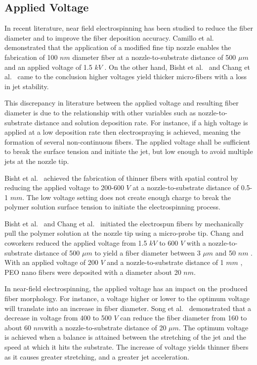 \documentclass[5p,,preprint,12pt,twocolumn]{elsarticle}
\begin{document}
\subsection{Applied Voltage}In recent literature, near field electrospinning has been studied to reduce the fiber diameter and to improve the fiber deposition accuracy. Camillo et al.\unskip~\cite{527120:12322072} demonstrated that the application of a modified fine tip nozzle enables the fabrication of 100 $nm $ diameter fiber at a nozzle-to-substrate distance of 500 $\mu m $ and an applied voltage of 1.5 $kV $ . On the other hand, Bisht et al.\unskip~\cite{527120:11973130} and Chang et al.\unskip~\cite{527120:11974306} came to the conclusion higher voltages yield thicker micro-fibers with a loss in jet stability.

This discrepancy in literature between the applied voltage and resulting fiber diameter is due to the relationship with other variables such as nozzle-to-substrate distance and solution deposition rate. For instance, if a high voltage is applied at a low deposition rate then electrospraying is achieved, meaning the formation of several non-continuous fibers. The applied voltage shall be sufficient to break the surface tension and initiate the jet, but low enough to avoid multiple jets at the nozzle tip.

Bisht et al.\unskip~\cite{527120:11973130} achieved the fabrication of thinner fibers with spatial control by reducing the applied voltage to 200-600 $V $  at a nozzle-to-substrate distance of 0.5-1 $mm $. The low voltage setting does not create enough charge to break the polymer solution surface tension to initiate the electrospinning process.

Bisht et al.\unskip~\cite{527120:11973130} and Chang et al.\unskip~\cite{527120:11974306} initiated the electrospun fibers by mechanically pull the polymer solution at the nozzle tip using a micro-probe tip. Chang and coworkers reduced the applied voltage from 1.5 $kV $ to 600 $V $ with a nozzle-to-substrate distance of 500 $\mu m $ to yield a fiber diameter between 3 $\mu m $  and 50 $nm $ . With an applied voltage of 200 $V $ and a nozzle-to-substrate distance of 1 $mm $ , PEO nano fibers were deposited with a diameter about 20 $nm $.

In near-field electrospinning, the applied voltage has an impact on the produced fiber morphology. For instance, a voltage higher or lower to the optimum voltage will translate into an increase in fiber diameter. Song et al.\unskip~\cite{527120:11974320} demonstrated that a decrease in voltage from 400 to 500 $V $ can reduce the fiber diameter from 160 to about 60 $nm $with a nozzle-to-substrate distance of 20 $\mu m $. The optimum voltage is achieved when a balance is attained between the stretching of the jet and the speed at which it hits the substrate. The increase of voltage yields thinner fibers as it causes greater stretching, and a greater jet acceleration.
\end{document}
